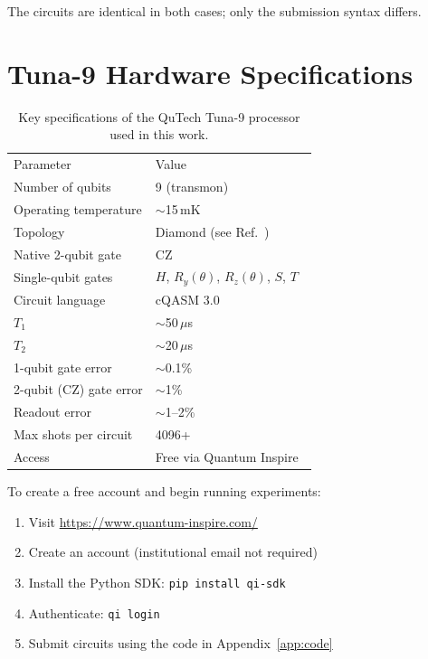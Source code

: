 \documentclass[amsmath,amssymb,reprint,aps,prb]{revtex4-2}
\begin{document}
The circuits are identical in both cases; only the submission syntax
differs.


\section{Tuna-9 Hardware Specifications}
\label{app:hardware}

\begin{table}[h]
\caption{\label{tab:hardware}Key specifications of the QuTech
Tuna-9 processor used in this work.}
\begin{ruledtabular}
\begin{tabular}{ll}
Parameter & Value \\
\colrule
Number of qubits        & 9 (transmon) \\
Operating temperature   & $\sim$15\,mK \\
Topology                & Diamond (see Ref.~\cite{QI2022}) \\
Native 2-qubit gate     & CZ \\
Single-qubit gates      & $H$, $R_y(\theta)$, $R_z(\theta)$,
                          $S$, $T$ \\
Circuit language         & cQASM 3.0 \\
$T_1$                    & $\sim$50\,$\mu$s \\
$T_2$                    & $\sim$20\,$\mu$s \\
1-qubit gate error       & $\sim$0.1\% \\
2-qubit (CZ) gate error  & $\sim$1\% \\
Readout error            & $\sim$1--2\% \\
Max shots per circuit    & 4096+ \\
Access                   & Free via Quantum Inspire~\cite{QI2022} \\
\end{tabular}
\end{ruledtabular}
\end{table}

To create a free account and begin running experiments:
\begin{enumerate}
\item Visit \url{https://www.quantum-inspire.com/}
\item Create an account (institutional email not required)
\item Install the Python SDK: \texttt{pip install qi-sdk}
\item Authenticate: \texttt{qi login}
\item Submit circuits using the code in Appendix~\ref{app:code}
\end{enumerate}
\end{document}
